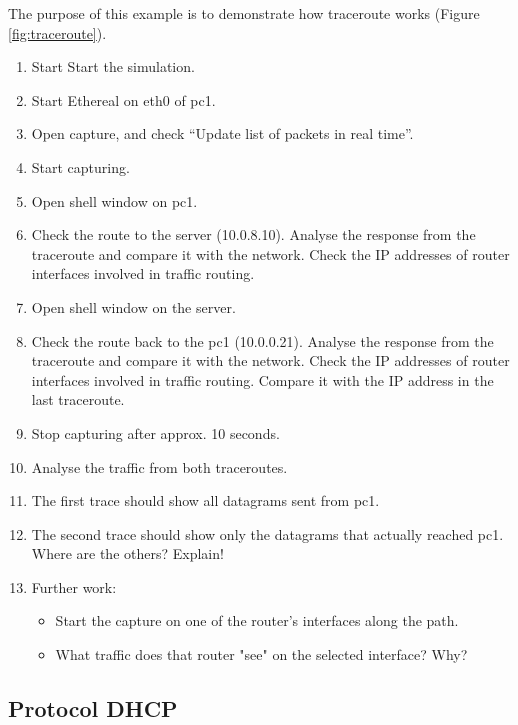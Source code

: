 The purpose of this example is to demonstrate how traceroute works (Figure
\ref{fig:traceroute}).


\begin{enumerate}
\item	Start Start the simulation.
\item	Start Ethereal on eth0 of pc1. 
\item	Open capture, and check ``Update list of packets in real time''.
\item	Start capturing.
\item	Open shell window on pc1.
\item	Check the route to the server (10.0.8.10). Analyse the response from
the traceroute and compare it with the network. Check the IP addresses of
router interfaces involved in traffic routing.
\item	Open shell window on the server.
\item	Check the route back to the pc1 (10.0.0.21). Analyse the response from
the traceroute and compare it with the network. Check the IP addresses of
router interfaces involved in traffic routing. Compare it with the IP address
in the last traceroute.
\item	Stop capturing after approx. 10 seconds.
\item	Analyse the traffic from both traceroutes.
\item	The first trace should show all datagrams sent from pc1.
\item	The second trace should show only the datagrams that actually reached
pc1. Where are the others? Explain! 
\item	Further work:
\begin{itemize}
\item	Start the capture on one of the router's interfaces along the path.
\item	What traffic does that router "see" on the selected interface? Why?
\end{itemize}
\end{enumerate}

\subsection{Protocol DHCP}

